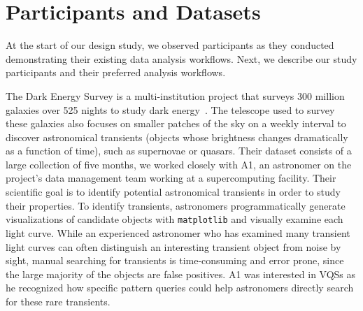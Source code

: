 \section{Participants and Datasets\label{sec:participantdatasets}}
At the start of our design study, we observed participants as they conducted  demonstrating their existing data analysis workflows. Next, we describe our study participants and their preferred analysis workflows.%
\par\noindent{} The Dark Energy Survey is a multi-institution project that surveys 300 million galaxies over 525 nights to study dark energy~\cite{Drlica-Wagner2017}. The telescope used to survey these galaxies also focuses on smaller patches of the sky on a weekly interval to discover astronomical transients (objects whose brightness changes dramatically as a function of time), such as supernovae or quasars. Their dataset consists of a large collection of  five months, we worked closely with A1, an astronomer on the project's data management team working at a supercomputing facility. Their scientific goal is to identify potential astronomical transients in order to study their properties. 
\npar To identify transients, astronomers programmatically generate visualizations of candidate objects with \texttt{matplotlib} and visually examine each light curve. While an experienced astronomer who has examined many transient light curves can often distinguish an interesting transient object from noise by sight, manual searching for transients is time-consuming and error prone, since the large majority of the objects are false positives. A1 was interested in VQSs as he recognized how specific pattern queries could help astronomers directly search for these rare transients.

